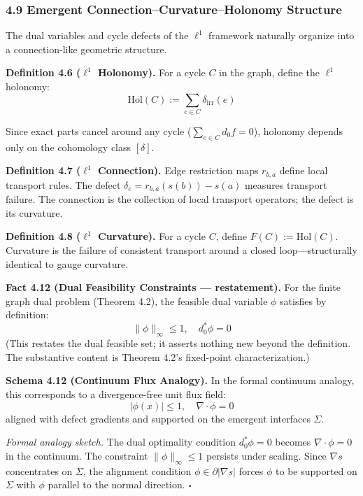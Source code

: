 \documentclass[
]{article}
\begin{document}
\subsubsection{4.9 Emergent Connection--Curvature--Holonomy Structure}\label{emergent-connectioncurvatureholonomy-structure}

The dual variables and cycle defects of the \(\ell^1\) framework naturally organize into a connection-like geometric structure.

\textbf{Definition 4.6 (\(\ell^1\) Holonomy).} For a cycle \(C\) in the graph, define the \(\ell^1\) holonomy:
\[ \mathrm{Hol}(C) := \sum_{e \in C} \delta_{\mathrm{irr}}(e) \]

Since exact parts cancel around any cycle (\(\sum_{e \in C} d_0 f = 0\)), holonomy depends only on the cohomology class \([\delta]\).

\textbf{Definition 4.7 (\(\ell^1\) Connection).} Edge restriction maps \(r_{b,a}\) define local transport rules. The defect \(\delta_e = r_{b,a}(s(b)) - s(a)\) measures transport failure. The connection is the collection of local transport operators; the defect is its curvature.

\textbf{Definition 4.8 (\(\ell^1\) Curvature).} For a cycle \(C\), define \(F(C) := \mathrm{Hol}(C)\). Curvature is the failure of consistent transport around a closed loop---structurally identical to gauge curvature.

\textbf{Fact 4.12 (Dual Feasibility Constraints --- restatement).} For the finite graph dual problem (Theorem 4.2), the feasible dual variable \(\phi\) satisfies by definition:
\[ \|\phi\|_\infty \le 1, \quad d_0^* \phi = 0 \]
(This restates the dual feasible set; it asserts nothing new beyond the definition. The substantive content is Theorem 4.2's fixed-point characterization.)

\textbf{Schema 4.12 (Continuum Flux Analogy).} In the formal continuum analogy, this corresponds to a divergence-free unit flux field:
\[ |\phi(x)| \le 1, \quad \nabla \cdot \phi = 0 \]
aligned with defect gradients and supported on the emergent interfaces \(\Sigma\).

\emph{Formal analogy sketch.} The dual optimality condition \(d_0^* \phi = 0\) becomes \(\nabla \cdot \phi = 0\) in the continuum. The constraint \(\|\phi\|_\infty \le 1\) persists under scaling. Since \(\nabla s\) concentrates on \(\Sigma\), the alignment condition \(\phi \in \partial |\nabla s|\) forces \(\phi\) to be supported on \(\Sigma\) with \(\phi\) parallel to the normal direction. \(\square\)
\end{document}
